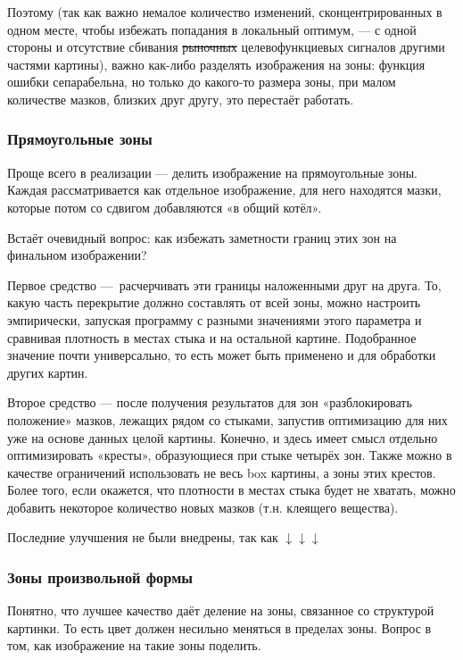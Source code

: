 Поэтому (так как важно немалое количество изменений, сконцентрированных в одном месте, чтобы избежать попадания в локальный оптимум, — с одной стороны
и отсутствие сбивания \sout{рыночных} целевофункциевых сигналов другими частями картины),
важно как-либо разделять изображения на зоны:
функция ошибки сепарабельна, но только до какого-то размера зоны, при малом количестве мазков, близких друг другу, это перестаёт работать.


\subsubsection{Прямоугольные зоны}
Проще всего в реализации — делить изображение на прямоугольные зоны.
Каждая рассматривается как отдельное изображение, для него находятся мазки, которые потом со сдвигом добавляются «в общий котёл».

Встаёт очевидный вопрос: как избежать заметности границ этих зон на финальном изображении?

Первое средство — расчерчивать эти границы наложенными друг на друга.
То, какую часть перекрытие должно составлять от всей зоны, можно настроить эмпирически, запуская программу с разными значениями этого параметра
и сравнивая плотность в местах стыка и на остальной картине.
Подобранное значение почти универсально, то есть может быть применено и для обработки других картин.

Второе средство — после получения результатов для зон «разблокировать положение» мазков, лежащих рядом со стыками,
запустив оптимизацию для них уже на основе данных целой картины.
Конечно, и здесь имеет смысл отдельно оптимизировать «кресты», образующиеся при стыке четырёх зон.
Также можно в качестве ограничений использовать не весь box картины, а зоны этих крестов.
Более того, если окажется, что плотности в местах стыка будет не хватать, можно добавить некоторое количество новых мазков (т.н. клеящего вещества).

Последние улучшения не были внедрены, так как $\downarrow\downarrow\downarrow$ %

\subsubsection{Зоны произвольной формы}
Понятно, что лучшее качество даёт деление на зоны, связанное со структурой картинки.
То есть цвет должен несильно меняться в пределах зоны.
Вопрос в том, как изображение на такие зоны поделить.

